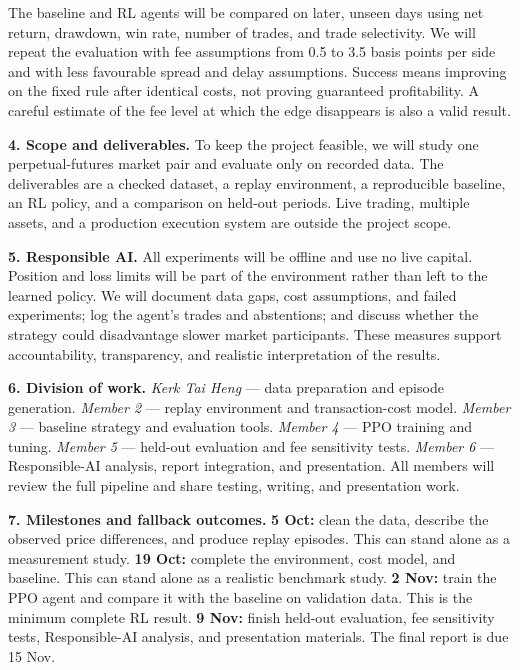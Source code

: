 \documentclass[10pt,a4paper]{article}
\begin{document}
The baseline and RL agents will be compared on later, unseen days using net return,
drawdown, win rate, number of trades, and trade selectivity. We will repeat the evaluation
with fee assumptions from 0.5 to 3.5 basis points per side and with less favourable spread
and delay assumptions. Success means improving on the fixed rule after identical costs,
not proving guaranteed profitability. A careful estimate of the fee level at which the
edge disappears is also a valid result.

\textbf{4. Scope and deliverables.}
To keep the project feasible, we will study one perpetual-futures market pair and evaluate
only on recorded data. The deliverables are a checked dataset, a replay environment, a
reproducible baseline, an RL policy, and a comparison on held-out periods. Live trading,
multiple assets, and a production execution system are outside the project scope.

\textbf{5. Responsible AI.}
All experiments will be offline and use no live capital. Position and loss limits will be
part of the environment rather than left to the learned policy. We will document data gaps,
cost assumptions, and failed experiments; log the agent's trades and abstentions; and
discuss whether the strategy could disadvantage slower market participants. These measures
support accountability, transparency, and realistic interpretation of the results.

\textbf{6. Division of work.}
\emph{Kerk Tai Heng} --- data preparation and episode generation.
\emph{Member 2} --- replay environment and transaction-cost model.
\emph{Member 3} --- baseline strategy and evaluation tools.
\emph{Member 4} --- PPO training and tuning.
\emph{Member 5} --- held-out evaluation and fee sensitivity tests.
\emph{Member 6} --- Responsible-AI analysis, report integration, and presentation.
All members will review the full pipeline and share testing, writing, and presentation work.

\textbf{7. Milestones and fallback outcomes.}
\textbf{5 Oct:} clean the data, describe the observed price differences, and produce replay
episodes. This can stand alone as a measurement study.
\textbf{19 Oct:} complete the environment, cost model, and baseline. This can stand alone as
a realistic benchmark study.
\textbf{2 Nov:} train the PPO agent and compare it with the baseline on validation data.
This is the minimum complete RL result.
\textbf{9 Nov:} finish held-out evaluation, fee sensitivity tests, Responsible-AI analysis,
and presentation materials. The final report is due 15 Nov.
\end{document}
